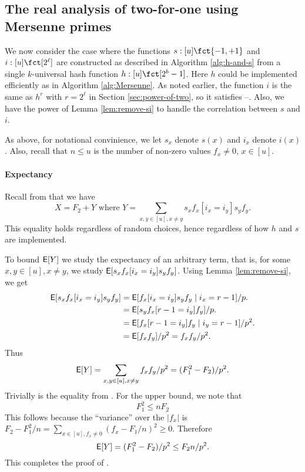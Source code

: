\subsection{The real analysis of two-for-one using Mersenne primes}
We now consider the case where the functions $s:[u]\fct\{-1,+1\}$ and
$i:[u]\fct[2^\ell]$ are constructed as described in Algorithm
\ref{alg:h-and-s} from a single $k$-universal hash function
$h:[u]\fct[2^b-1]$. Here $h$ could be implemented efficiently as
in Algorithm \ref{alg:Mersenne}. As noted earlier, the function
$i$ is the same as $h^r$ with $r=2^\ell$ in Section \ref{sec:power-of-two},
so it satisfies --. Also, we
have the power of Lemma \ref{lem:remove-si} to handle the correlation
between $s$ and $i$.

As above, for notational convinience, we let $s_x$ denote $s(x)$ and $i_x$ denote $i(x)$. Also, recall that $n\leq u$ is the number of non-zero values
$f_x\neq 0$, $x\in [u]$.



\paragraph{Expectancy}
Recall from  that
we have
\[X=F_2+Y\mbox{ where }Y=\sum_{x,y\in[u],x\neq y} s_x f_x[i_x=i_y]s_y f_y.\]
This equality holds regardless of random choices, hence regardless of
how $h$ and $s$ are implemented.

To bound $\operatorname*{\sf{E}}[Y]$ we study the expectancy of an arbitrary term, that is,
for some $x,y\in[u],x\neq y$, we study $\operatorname*{\sf{E}}[ s_x f_x[i_x=i_y]s_y f_y]$.
Using Lemma \ref{lem:remove-si}, we get 
\begin{align}
\E[s_x f_x[i_x=i_y]s_y f_y]&=\E[f_x[i_x=i_y]s_y f_y\suchthat i_x=r-1]/p.\nonumber\\
&=\E[s_y f_x[r-1=i_y]f_y]/p.\nonumber\\
&=\E[f_x[r-1=i_y]f_y\suchthat i_y=r-1]/p^2.\nonumber\\
&=\E[f_xf_y]/p^2=f_x f_y/p^2.\label{eq:E}
\end{align}
Thus
\[\operatorname*{\sf{E}}[Y]=\sum_{x,y\in[u],x\neq y} f_xf_y/p^2=(F_1^2-F_2)/p^2.\]
Trivially is the equality from . For the upper bound, we note that 
\begin{equation}\label{eq:F1F2}
F_1^2\leq nF_2 
\end{equation}
This follows because the ``variance'' over the $|f_x|$ is
$F_2-F_1^2/n=\sum_{x\in[u], f_x\neq 0}(f_x-F_1/n)^2\geq 0$.
Therefore
\[\operatorname*{\sf{E}}[Y]=(F_1^2-F_2)/p^2\leq F_2n/p^2.\]
This completes the proof of .

